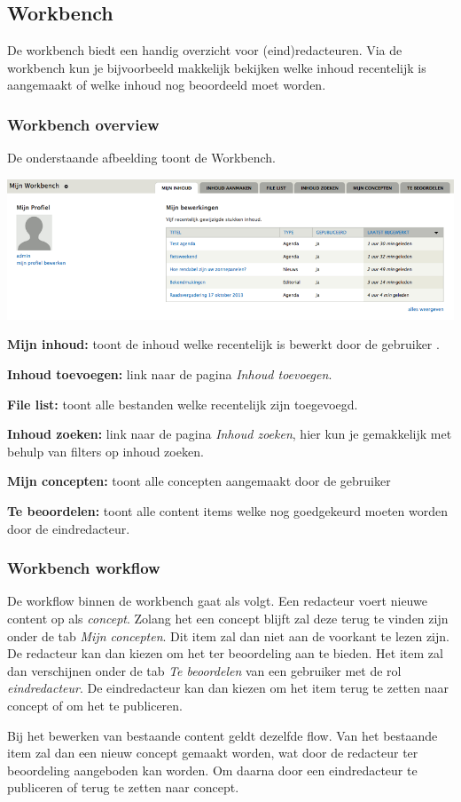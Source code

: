 \subsection{Workbench}\label{workbench}
De workbench biedt een handig overzicht voor (eind)redacteuren. Via de workbench kun je bijvoorbeeld makkelijk bekijken welke inhoud recentelijk is aangemaakt of welke inhoud nog beoordeeld moet worden.

\subsubsection{Workbench overview}\label{workbenchoverview}
De onderstaande afbeelding toont de Workbench. 
\bigskip

\begin{center}
	\includegraphics[width=\textwidth]{img/workbench.png}
\end{center}

\textbf{Mijn inhoud:} toont de inhoud welke recentelijk is bewerkt door de gebruiker .

\textbf{Inhoud toevoegen:} link naar de pagina \emph{Inhoud toevoegen}.

\textbf{File list:} toont alle bestanden welke recentelijk zijn toegevoegd.

\textbf{Inhoud zoeken:} link naar de pagina \emph{Inhoud zoeken}, hier kun je gemakkelijk met behulp van filters op inhoud zoeken.

\textbf{Mijn concepten:} toont alle concepten aangemaakt door de gebruiker 

\textbf{Te beoordelen:} toont alle content items welke nog goedgekeurd moeten worden door de eindredacteur.

\subsubsection{Workbench workflow}\label{workbenchworkflow}

De workflow binnen de workbench gaat als volgt. Een redacteur voert nieuwe content op als \emph{concept}. Zolang het een concept blijft zal deze terug te vinden zijn onder de tab \emph{Mijn concepten}. Dit item zal dan niet aan de voorkant te lezen zijn. De redacteur kan dan kiezen om het ter beoordeling aan te bieden. Het item zal dan verschijnen onder de tab \emph{Te beoordelen} van een gebruiker met de rol \emph{eindredacteur}. De eindredacteur kan dan kiezen om het item terug te zetten naar concept of om het te publiceren. 

Bij het bewerken van bestaande content geldt dezelfde flow. Van het bestaande item zal dan een nieuw concept gemaakt worden, wat door de redacteur ter beoordeling aangeboden kan worden. Om daarna door een eindredacteur te publiceren of terug te zetten naar concept.